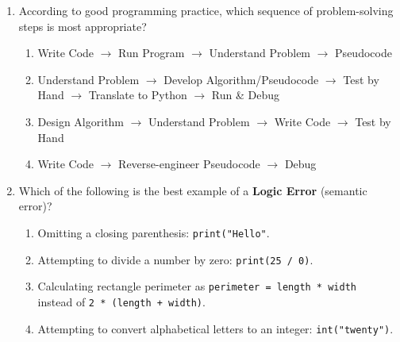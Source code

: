 \documentclass[11pt,a4paper]{article}
\begin{document}
\begin{enumerate}[label=\textbf{Q\arabic*.},leftmargin=2em,itemsep=2pt,topsep=1pt]
\begin{enumerate}[label=\Alph*.,noitemsep,topsep=0.5pt,leftmargin=2em]
    \item \texttt{float}

    \item \texttt{str}

    \item Depends automatically on whether the input text contains numeric digits.

  \end{enumerate}

  \item According to good programming practice, which sequence of problem-solving steps is most appropriate?

  \begin{enumerate}[label=\Alph*.,noitemsep,topsep=0.5pt,leftmargin=2em]

    \item Write Code $\rightarrow$ Run Program $\rightarrow$ Understand Problem $\rightarrow$ Pseudocode

    \item Understand Problem $\rightarrow$ Develop Algorithm/Pseudocode $\rightarrow$ Test by Hand $\rightarrow$ Translate to Python $\rightarrow$ Run \& Debug

    \item Design Algorithm $\rightarrow$ Understand Problem $\rightarrow$ Write Code $\rightarrow$ Test by Hand

    \item Write Code $\rightarrow$ Reverse-engineer Pseudocode $\rightarrow$ Debug

  \end{enumerate}

  \item Which of the following is the best example of a \textbf{Logic Error} (semantic error)?

  \begin{enumerate}[label=\Alph*.,noitemsep,topsep=0.5pt,leftmargin=2em]

    \item Omitting a closing parenthesis: \texttt{print("Hello"}.

    \item Attempting to divide a number by zero: \texttt{print(25 / 0)}.

    \item Calculating rectangle perimeter as \texttt{perimeter = length * width}\\
    instead of \texttt{2 * (length + width)}.

    \item Attempting to convert alphabetical letters to an integer: \texttt{int("twenty")}.

  \end{enumerate}

\end{enumerate}
\end{document}
